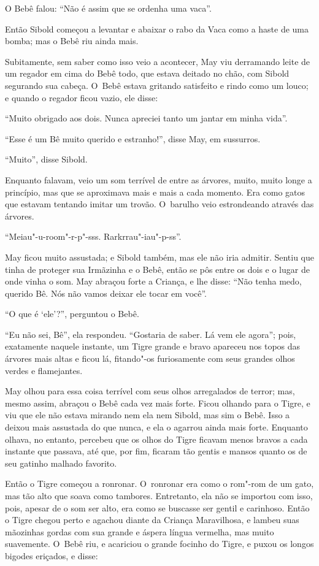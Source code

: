 O Bebê falou: ``Não é assim que se ordenha uma vaca''.

Então Sibold começou a levantar e abaixar o rabo da Vaca como a haste de
uma bomba; mas o Bebê riu ainda mais.

Subitamente, sem saber como isso veio a acontecer, May viu derramando
leite de um regador em cima do Bebê todo, que estava deitado no chão,
com Sibold segurando sua cabeça. O~Bebê estava gritando satisfeito e
rindo como um louco; e quando o regador ficou vazio, ele disse:

``Muito obrigado aos dois. Nunca apreciei tanto um jantar em minha
vida''.

``Esse é um Bê muito querido e estranho!'', disse May, em sussurros.

``Muito'', disse Sibold.

Enquanto falavam, veio um som terrível de entre as árvores, muito, muito
longe a princípio, mas que se aproximava mais e mais a cada momento. Era
como gatos que estavam tentando imitar um trovão. O~barulho veio
estrondeando através das árvores.

``Meiau"-u-room"-r-p"-sss. Rarkrrau"-iau"-p-ss''.

May ficou muito assustada; e Sibold também, mas ele não iria admitir.
Sentiu que tinha de proteger sua Irmãzinha e o Bebê, então se pôs entre
os dois e o lugar de onde vinha o som. May abraçou forte a Criança, e
lhe disse: ``Não tenha medo, querido Bê. Nós não vamos deixar ele tocar
em você''.

``O que é `ele'?'', perguntou o Bebê.

``Eu não sei, Bê'', ela respondeu. ``Gostaria de saber. Lá vem ele
agora''; pois, exatamente naquele instante, um Tigre grande e bravo
apareceu nos topos das árvores mais altas e ficou lá, fitando"-os
furiosamente com seus grandes olhos verdes e flamejantes.

May olhou para essa coisa terrível com seus olhos arregalados de terror;
mas, mesmo assim, abraçou o Bebê cada vez mais forte. Ficou olhando para
o Tigre, e viu que ele não estava mirando nem ela nem Sibold, mas sim o
Bebê. Isso a deixou mais assustada do que nunca, e ela o agarrou ainda
mais forte. Enquanto olhava, no entanto, percebeu que os olhos do Tigre
ficavam menos bravos a cada instante que passava, até que, por fim,
ficaram tão gentis e mansos quanto os de seu gatinho malhado favorito.

Então o Tigre começou a ronronar. O~ronronar era como o rom"-rom de um
gato, mas tão alto que soava como tambores. Entretanto, ela não se
importou com isso, pois, apesar de o som ser alto, era como se buscasse
ser gentil e carinhoso. Então o Tigre chegou perto e agachou diante da
Criança Maravilhosa, e lambeu suas mãozinhas gordas com sua grande e
áspera língua vermelha, mas muito suavemente. O~Bebê riu, e acariciou o
grande focinho do Tigre, e puxou os longos bigodes eriçados, e disse:

